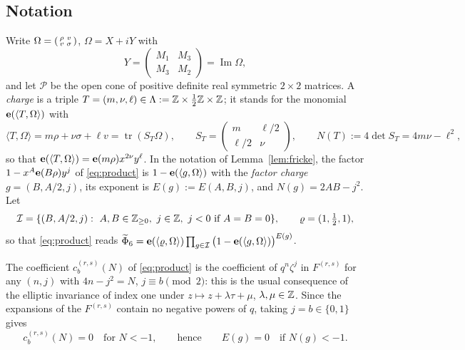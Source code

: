 \subsection{Notation}
Write $\Omega=\begin{psmallmatrix}\rho&v\\v&\sigma\end{psmallmatrix}$, $\Omega=X+iY$ with
\[
Y=\begin{pmatrix}M_1&M_3\\M_3&M_2\end{pmatrix}=\operatorname{Im}\Omega,
\]
and let $\mathcal P$ be the open cone of positive definite real symmetric $2\times2$ matrices. A \emph{charge} is a triple $T=(m,\nu,\ell)\in\Lambda:=\mathbb{Z}\times\frac12\mathbb{Z}\times\mathbb{Z}$; it stands for the monomial $\mathbf e(\langle T,\Omega\rangle)$ with
\[
\langle T,\Omega\rangle=m\rho+\nu\sigma+\ell v=\operatorname{tr}(S_T\Omega),\qquad S_T=\begin{pmatrix}m&\ell/2\\\ell/2&\nu\end{pmatrix},\qquad N(T):=4\det S_T=4m\nu-\ell^2 ,
\]
so that $\mathbf e(\langle T,\Omega\rangle)=\mathbf e(m\rho)x^{2\nu}y^\ell$. In the notation of Lemma~\ref{lem:fricke}, the factor $1-x^A\mathbf e(B\rho)y^j$ of \eqref{eq:product} is $1-\mathbf e(\langle g,\Omega\rangle)$ with the \emph{factor charge} $g=(B,A/2,j)$, its exponent is $E(g):=E(A,B,j)$, and $N(g)=2AB-j^2$. Let
\[
\mathcal I=\{(B,A/2,j):\ A,B\in\ZZ_{\ge0},\ j\in\ZZ,\ j<0\text{ if }A=B=0\},\qquad \varrho=(1,\tfrac12,1),
\]
so that \eqref{eq:product} reads $\widetilde\Phi_6=\mathbf e(\langle\varrho,\Omega\rangle)\prod_{g\in\mathcal I}\big(1-\mathbf e(\langle g,\Omega\rangle)\big)^{E(g)}$.

The coefficient $c^{(r,s)}_b(N)$ of \eqref{eq:product} is the coefficient of $q^n\zeta^j$ in $F^{(r,s)}$ for any $(n,j)$ with $4n-j^2=N$, $j\equiv b\pmod 2$: this is the usual consequence of the elliptic invariance of index one under $z\mapsto z+\lambda\tau+\mu$, $\lambda,\mu\in\mathbb{Z}$. Since the expansions of the $F^{(r,s)}$ contain no negative powers of $q$, taking $j=b\in\{0,1\}$ gives
\begin{equation}\label{eq:cvanish}
c^{(r,s)}_b(N)=0\quad\text{for }N<-1,\qquad\text{hence}\qquad E(g)=0\quad\text{if }N(g)<-1.
\end{equation}

